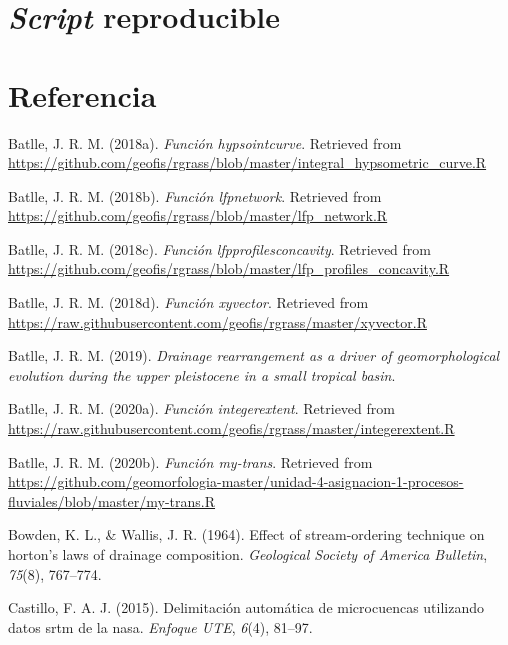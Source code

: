 \documentclass[11pt,]{article}
\begin{document}
\section{\texorpdfstring{\emph{Script}
reproducible}{Script reproducible}}\label{script-reproducible}

\section*{Referencia}\label{referencia}

\hypertarget{refs}{}
\hypertarget{ref-Hypsocjose}{}
Batlle, J. R. M. (2018a). \emph{Función hypsointcurve}. Retrieved from
\url{https://github.com/geofis/rgrass/blob/master/integral_hypsometric_curve.R}

\hypertarget{ref-lfpnetjose}{}
Batlle, J. R. M. (2018b). \emph{Función lfpnetwork}. Retrieved from
\url{https://github.com/geofis/rgrass/blob/master/lfp_network.R}

\hypertarget{ref-lfpconcajose}{}
Batlle, J. R. M. (2018c). \emph{Función lfpprofilesconcavity}. Retrieved
from
\url{https://github.com/geofis/rgrass/blob/master/lfp_profiles_concavity.R}

\hypertarget{ref-xyvector}{}
Batlle, J. R. M. (2018d). \emph{Función xyvector}. Retrieved from
\url{https://raw.githubusercontent.com/geofis/rgrass/master/xyvector.R}

\hypertarget{ref-batlle2019drainage}{}
Batlle, J. R. M. (2019). \emph{Drainage rearrangement as a driver of
geomorphological evolution during the upper pleistocene in a small
tropical basin}.

\hypertarget{ref-intext}{}
Batlle, J. R. M. (2020a). \emph{Función integerextent}. Retrieved from
\url{https://raw.githubusercontent.com/geofis/rgrass/master/integerextent.R}

\hypertarget{ref-Mytransjose}{}
Batlle, J. R. M. (2020b). \emph{Función my-trans}. Retrieved from
\url{https://github.com/geomorfologia-master/unidad-4-asignacion-1-procesos-fluviales/blob/master/my-trans.R}

\hypertarget{ref-bowden1964effect}{}
Bowden, K. L., \& Wallis, J. R. (1964). Effect of stream-ordering
technique on horton's laws of drainage composition. \emph{Geological
Society of America Bulletin}, \emph{75}(8), 767--774.

\hypertarget{ref-castillo2015delimitacion}{}
Castillo, F. A. J. (2015). Delimitación automática de microcuencas
utilizando datos srtm de la nasa. \emph{Enfoque UTE}, \emph{6}(4),
81--97.
\end{document}
